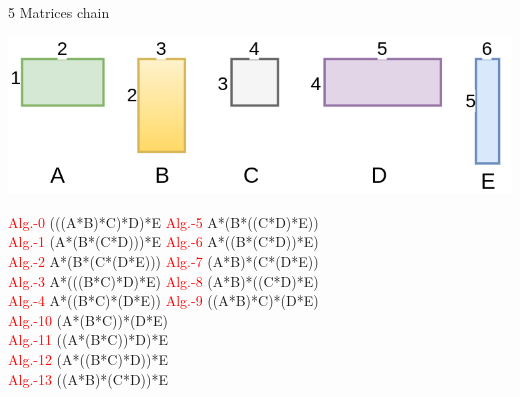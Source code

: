 \documentclass[10pts]{beamer}
\begin{document}
	 	\begin{frame}[t]{5 Matrices chain}
	 		\begin{center}
	 			\includegraphics[scale =0.2]{chain_matrix_numero.png}
	 		\end{center}
	 		
	 		   	\begin{center}
	 		   	
	 		   	\textcolor{red}{Alg.-0} (((A*B)*C)*D)*E  \hspace{30pt}\textcolor{red}{Alg.-5} A*(B*((C*D)*E))\\
	 		   	
	 		   	\textcolor{red}{Alg.-1} (A*(B*(C*D)))*E \hspace{30pt}\textcolor{red}{Alg.-6} A*((B*(C*D))*E) \\
	 		   	\textcolor{red}{Alg.-2} A*(B*(C*(D*E))) \hspace{30pt}\textcolor{red}{Alg.-7} (A*B)*(C*(D*E))\\
	 		   	\textcolor{red}{Alg.-3} A*(((B*C)*D)*E) \hspace{30pt}\textcolor{red}{Alg.-8} (A*B)*((C*D)*E) \\
	 		   	\textcolor{red}{Alg.-4} A*((B*C)*(D*E)) \hspace{30pt}\textcolor{red}{Alg.-9} ((A*B)*C)*(D*E)\\
	 		   	 
	 		   	
	 		   	
	 		   	
	 		   
	 		   	\textcolor{red}{Alg.-10} (A*(B*C))*(D*E)\\
	 		   	\textcolor{red}{Alg.-11} ((A*(B*C))*D)*E\\
	 		   	\textcolor{red}{Alg.-12} (A*((B*C)*D))*E\\
	 		   	\textcolor{red}{Alg.-13} ((A*B)*(C*D))*E\\
	 		   	
	 			   	 			
	 			\end{center}
	 			
	 	\end{frame} 	
	 	
\end{document}

